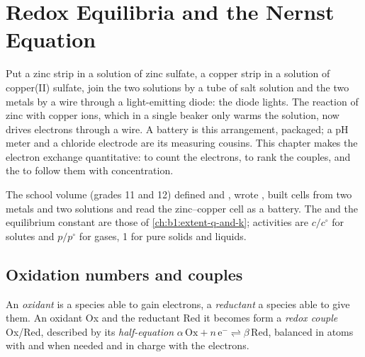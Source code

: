\chapter{Redox Equilibria and the Nernst Equation}\label{ch:b1:nernst}

Put a zinc strip in a solution of zinc sulfate, a copper strip in a
solution of copper(II) sulfate, join the two solutions by a tube of salt
solution and the two metals by a wire through a light-emitting diode: the
diode lights. The reaction of zinc with copper ions, which in a single
beaker only warms the solution, now drives electrons through a wire. A
battery is this arrangement, packaged; a pH meter and a chloride
electrode are its measuring cousins. This chapter makes the electron
exchange quantitative:  to count the electrons,
 to rank the couples, and the  to
follow them with concentration.

\begin{recall}
The school volume (grades 11 and 12) defined  and ,
wrote , built cells from two metals and two solutions and
read the zinc--copper cell as a battery. The  and the
equilibrium constant are those of \cref{ch:b1:extent-q-and-k}; activities
are $c/c^\circ$ for solutes and $p/p^\circ$ for gases, 1 for pure solids
and liquids.
\end{recall}

\section{Oxidation numbers and couples}

\begin{definition}\label{def:b1:nernst:couple}
An \emph{oxidant} is a species able to gain electrons, a
\emph{reductant} a species able to give them. An oxidant
Ox and the reductant Red it becomes form a \emph{redox
couple} Ox/Red, described by its
\emph{half-equation}
$\alpha\,\mathrm{Ox} + n\,\mathrm{e^-} \rightleftharpoons
\beta\,\mathrm{Red}$, balanced in atoms with  and  when
needed and in charge with the electrons.
\end{definition}

